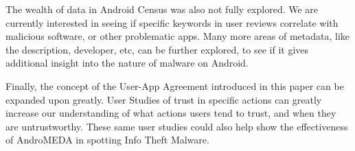 The wealth of data in Android Census was also not fully explored. We are currently interested in seeing if specific keywords in user reviews correlate with malicious software, or other problematic apps. Many more areas of metadata, like the description, developer, etc, can be further explored, to see if it gives additional insight into the nature of malware on Android.

Finally, the concept of the User-App Agreement introduced in this paper can be expanded upon greatly. User Studies of trust in specific actions can greatly increase our understanding of what actions users tend to trust, and when they are untrustworthy. These same user studies could also help show the effectiveness of AndroMEDA in spotting Info Theft Malware.